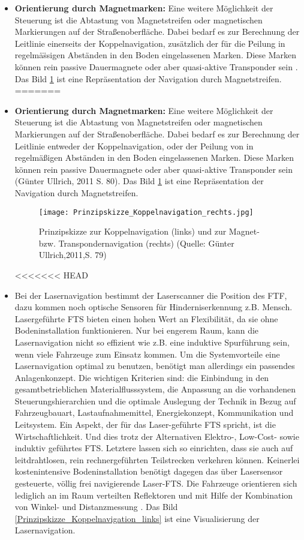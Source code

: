 \begin{itemize}
\begin{itemize}
	\item \textbf{Orientierung durch Magnetmarken:} Eine weitere M\"oglichkeit der Steuerung ist die Abtastung von Magnetstreifen oder magnetischen Markierungen auf der Straßenoberfl\"ache. Dabei bedarf es zur Berechnung der Leitlinie einerseits der Koppelnavigation, zus\"atzlich der f\"ur die Peilung in regelm\"a\"ssigen Abst\"anden in den Boden eingelassenen Marken. Diese Marken k\"onnen rein passive Dauermagnete oder aber quasi-aktive Transponder sein \cite[S. 80]{Guenther:2011}. Das Bild \ref{Prinzipskizze_Koppelnavigation_rechts} ist eine Repr\"asentation der Navigation durch Magnetstreifen.
=======
	\item \textbf{Orientierung durch Magnetmarken:} Eine weitere M\"oglichkeit der Steuerung ist die Abtastung von Magnetstreifen oder magnetischen Markierungen auf der Straßenoberfl\"ache.
Dabei bedarf es zur Berechnung der Leitlinie entweder der Koppelnavigation, oder der Peilung von in regelm\"a\ss igen Abst\"anden in den Boden eingelassenen Marken.
Diese Marken k\"onnen rein passive Dauermagnete oder aber quasi-aktive Transponder sein (G\"unter Ullrich, 2011 S. 80).
Das Bild \ref{Prinzipskizze_Koppelnavigation_rechts} ist eine Repr\"asentation der Navigation durch Magnetstreifen.
	\begin{figure}[h!]
		\centering
			\texttt{[image: Prinzipskizze\_Koppelnavigation\_rechts.jpg]}
			\caption{Prinzipskizze zur Koppelnavigation (links) und zur Magnet- bzw. Transpondernavigation (rechts) (Quelle: G\"unter Ullrich,2011,S. 79)}
			\label{Prinzipskizze_Koppelnavigation_rechts}
	\end{figure}	
<<<<<<< HEAD
	\item Bei der Lasernavigation bestimmt der Laserscanner die Position des FTF, dazu kommen noch optische Sensoren f\"ur Hinderniserkennung z.B. Mensch. Lasergef\"uhrte FTS bieten einen hohen Wert an Flexibilit\"at, da sie ohne Bodeninstallation funktionieren. Nur bei engerem Raum, kann die Lasernavigation nicht so effizient wie z.B. eine induktive Spurf\"uhrung sein, wenn viele Fahrzeuge zum Einsatz kommen. Um die Systemvorteile eine Lasernavigation optimal zu benutzen, ben\"otigt man allerdings ein passendes Anlagenkonzept. Die wichtigen Kriterien sind: die Einbindung in den gesamtbetrieblichen Materialflusssystem, die Anpassung an die vorhandenen Steuerungshierarchien und die optimale Auslegung der Technik in Bezug auf Fahrzeugbauart, Lastaufnahmemittel, Energiekonzept, Kommunikation und Leitsystem. Ein Aspekt, der f\"ur das Laser-gef\"uhrte FTS spricht, ist die Wirtschaftlichkeit. Und dies trotz der Alternativen Elektro-, Low-Cost- sowie induktiv gef\"uhrtes FTS. Letztere lassen sich so einrichten, dass sie auch auf leitdrahtlosen, rein rechnergef\"uhrten Teilstrecken verkehren k\"onnen. Keinerlei kostenintensive Bodeninstallation ben\"otigt dagegen das \"uber Lasersensor gesteuerte, v\"ollig frei navigierende Laser-FTS. Die Fahrzeuge orientieren sich lediglich an im Raum verteilten Reflektoren und mit Hilfe der Kombination von Winkel- und Distanzmessung \cite{Werner:2014:Online}. Das Bild \ref{Prinzipskizze_Koppelnavigation_links} ist eine Visualisierung der Lasernavigation.

\end{itemize}
\end{itemize}
